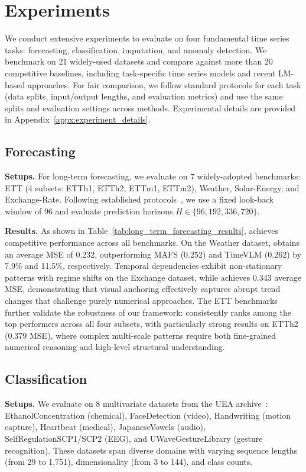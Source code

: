 




\section{Experiments}
\label{sec:experiments}
We conduct extensive experiments to evaluate \model on four fundamental time series tasks: forecasting, classification, imputation, and anomaly detection.
We benchmark on 21 widely-used datasets and compare against more than 20 competitive baselines, including task-specific time series models and recent LM-based approaches.
For fair comparison, we follow standard protocols for each task (data splits, input/output lengths, and evaluation metrics) and use the same splits and evaluation settings across methods.
Experimental details are provided in Appendix~\ref{appx:experiment_details}.

\subsection{Forecasting}
\label{sec:exp_forecasting}
\noindent\textbf{Setups.}
For long-term forecasting, we evaluate on 7 widely-adopted benchmarks: ETT (4 subsets: ETTh1, ETTh2, ETTm1, ETTm2), Weather, Solar-Energy, and Exchange-Rate.
Following established protocols~\cite{wu2023timesnet,liu2023itransformer}, we use a fixed look-back window of 96 and evaluate prediction horizons \(H \in \{96, 192, 336, 720\}\).

\noindent\textbf{Results.} As shown in Table~\ref{tab:long_term_forecasting_results}, \model achieves competitive performance across all benchmarks. On the Weather dataset, \model obtains an average MSE of 0.232, outperforming MAFS (0.252) and TimeVLM (0.262) by 7.9\% and 11.5\%, respectively.
Temporal dependencies exhibit non-stationary patterns with regime shifts on the Exchange dataset, while \model achieves 0.343 average MSE, demonstrating that visual anchoring effectively captures abrupt trend changes that challenge purely numerical approaches. 
The ETT benchmarks further validate the robustness of our framework: \model consistently ranks among the top performers across all four subsets, with particularly strong results on ETTh2 (0.379 MSE), where complex multi-scale patterns require both fine-grained numerical reasoning and high-level structural understanding.

\subsection{Classification}
\noindent\textbf{Setups.} We evaluate on 8 multivariate datasets from the UEA archive~\cite{bagnall2018uea}: EthanolConcentration (chemical), FaceDetection (video), Handwriting (motion capture), Heartbeat (medical), JapaneseVowels (audio), SelfRegulationSCP1/SCP2 (EEG), and UWaveGestureLibrary (gesture recognition). These datasets span diverse domains with varying sequence lengths (from 29 to 1,751), dimensionality (from 3 to 144), and class counts.

